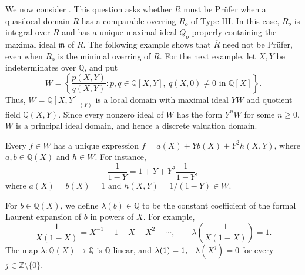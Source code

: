 \documentclass[12pt]{article}
\begin{document}
	We now consider \cite[Problem 30]{ayache}. This question asks whether $\overline R$ must be Prüfer when a quasilocal domain $R$ has a comparable overring $R_o$ of Type III. In this case, $R_o$ is integral over $R$ and has a unique maximal ideal $Q_o$ properly containing the maximal ideal $\mathfrak m$ of $R$. The following example shows that $\overline R$ need not be Prüfer, even when $R_o$ is the minimal overring of $R$. For the next example, let $X,Y$ be indeterminates over $\mathbb Q$, and put
	\[ W= \left\{ \frac{p(X,Y)}{q(X,Y)}: p,q\in\mathbb Q[X,Y],\ q(X,0)\neq0\text{ in }\mathbb Q[X] \right\}. \]
	Thus, $W=\mathbb Q[X,Y]_{(Y)}$ is a local domain with maximal ideal $YW$ and quotient field $\mathbb Q(X,Y)$. Since every nonzero ideal of $W$ has the form $Y^nW$ for some $n\geq0$, $W$ is a principal ideal domain, and hence a discrete valuation domain.

	Every $f\in W$ has a unique expression $f=a(X)+Yb(X)+Y^2h(X,Y) $, where $a,b\in\mathbb Q(X)$ and $ h\in W. $ For instance,
	\[ \frac{1}{1-Y}=1+Y+Y^2\frac{1}{1-Y}, \]
	where $a(X)=b(X)=1$ and $h(X,Y)=1/(1-Y)\in W$.

	For $b\in\mathbb Q(X)$, we define $\lambda(b)\in\mathbb Q$ to be the constant coefficient of the formal Laurent expansion of $b$ in powers of $X$. For example,
	\[ \frac{1}{X(1-X)} =X^{-1}+1+X+X^2+\cdots, \qquad \lambda\left(\frac{1}{X(1-X)}\right)=1. \]
	The map $\lambda:\mathbb{Q}(X)\longrightarrow \mathbb{Q}$ is $\mathbb Q$-linear, and $\lambda(1)=1,\hspace{2mm}$ $ \lambda(X^j)=0$ for every $j\in\mathbb Z\setminus\{0\}.$
\end{document}
